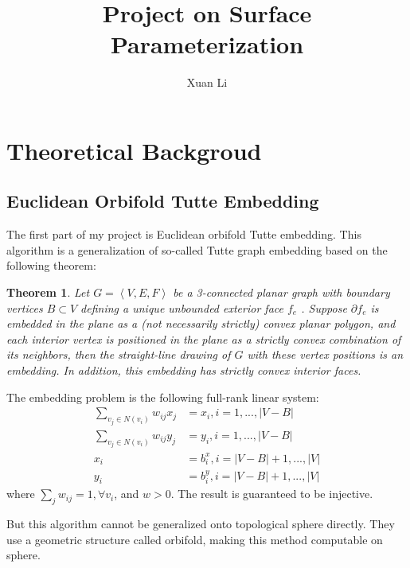 \documentclass[fleqn,10pt]{wlscirep}
\title{Project on Surface Parameterization}
\author[1,*]{Xuan Li}
\affil[1]{Department of Computer Science, Stony Brook University}
\affil[*]{SBU ID: 111676019}
\newtheorem{theorem}{Theorem}[section]
\begin{document}
\flushbottom
\maketitle
%
%







\section{Theoretical Backgroud}
\subsection{Euclidean Orbifold Tutte Embedding}
The first part of my project is Euclidean orbifold Tutte embedding\cite{Aigerman:2015:OTE:2816795.2818099}. This algorithm is a generalization of so-called Tutte graph embedding based on the following theorem:
\begin{theorem}\label{tutte-theorem}
Let $G = \left<V , E , F \right>$ be a 3-connected planar graph with boundary vertices $B \subset V$ defining a unique unbounded exterior face $f_e$ . Suppose $\partial f_e$ is embedded in the plane as a (not necessarily strictly) convex planar polygon, and each interior vertex is positioned in the plane as a strictly convex combination of its neighbors, then the straight-line drawing of $G$ with these vertex positions is an embedding. In addition, this embedding has strictly convex interior faces.
\end{theorem}
The embedding problem is the following full-rank linear system:
\begin{equation}
\begin{split}
\sum_{v_j \in \mathit{N}(v_i)} w_{ij}x_j &= x_i, i = 1, ..., |V - B|\\
\sum_{v_j \in \mathit{N}(v_i)} w_{ij}y_j &= y_i, i = 1, ..., |V - B|\\
x_i &= b_i^x, i = |V-B| + 1, ... , |V|\\
y_i &= b_i^y, i = |V-B| + 1, ... , |V|
\end{split}
\label{eq:tutte}
\end{equation}
where $\sum_{j}w_{ij} = 1, \forall v_i$, and $w > 0$.
The result is guaranteed to be injective.

But this algorithm cannot be generalized onto topological sphere directly.
They \cite{Aigerman:2015:OTE:2816795.2818099} use a geometric structure called orbifold, making this method computable on sphere.
\end{document}
